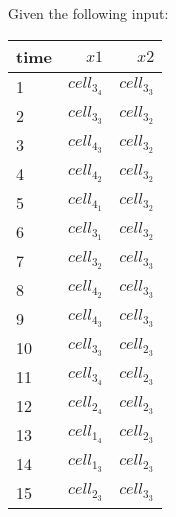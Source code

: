 
Given the following input:
\begin{table}[ht!]
\begin{center}
\begin{tabular}{|l|r|r|}
\hline
time & $\mathit{x}1$& $\mathit{x}2$\\
\hline
1 & $\mathit{cell}_3_4$& $\mathit{cell}_3_3$ \\
2 & $\mathit{cell}_3_3$& $\mathit{cell}_3_2$ \\
3 & $\mathit{cell}_4_3$& $\mathit{cell}_3_2$ \\
4 & $\mathit{cell}_4_2$& $\mathit{cell}_3_2$ \\
5 & $\mathit{cell}_4_1$& $\mathit{cell}_3_2$ \\
6 & $\mathit{cell}_3_1$& $\mathit{cell}_3_2$ \\
7 & $\mathit{cell}_3_2$& $\mathit{cell}_3_3$ \\
8 & $\mathit{cell}_4_2$& $\mathit{cell}_3_3$ \\
9 & $\mathit{cell}_4_3$& $\mathit{cell}_3_3$ \\
10 & $\mathit{cell}_3_3$& $\mathit{cell}_2_3$ \\
11 & $\mathit{cell}_3_4$& $\mathit{cell}_2_3$ \\
12 & $\mathit{cell}_2_4$& $\mathit{cell}_2_3$ \\
13 & $\mathit{cell}_1_4$& $\mathit{cell}_2_3$ \\
14 & $\mathit{cell}_1_3$& $\mathit{cell}_2_3$ \\
15 & $\mathit{cell}_2_3$& $\mathit{cell}_3_3$ \\
\hline
\end{tabular}
\end{center}
\end{table}

